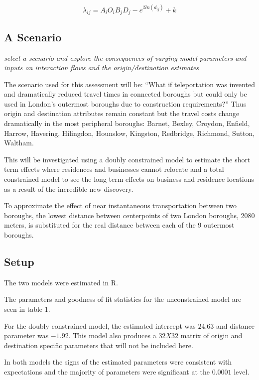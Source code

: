 \documentclass[11pt]{article} %
\begin{document}
\begin{equation}
\lambda_{ij} = A_i O_i  B_j D_j - e ^{ \beta ln( d_{ij})} + k
\end{equation}



\subsection{A Scenario}

\textit{select a scenario and explore the consequences of varying model parameters and inputs on interaction flows and the origin/destination estimates}

The scenario used for this assessment will be: ``What if teleportation  was invented and dramatically reduced travel times in connected boroughs but could only be used in London's outermost boroughs due to construction requirements?'' Thus origin and destination attributes remain constant but the travel costs change dramatically in the most peripheral boroughs: Barnet, Bexley, Croydon, Enfield, Harrow, Havering, Hilingdon, Hounslow, Kingston, Redbridge, Richmond, Sutton, Waltham. 


This will be investigated using a doubly constrained model to estimate the short term effects where residences and businesses cannot relocate and a total constrained model to see the long term effects on business and residence locations as a result of the incredible new discovery. 

To approximate the effect of near instantaneous transportation between two boroughs, the lowest distance between centerpoints of two London boroughs, 2080 meters, is substituted for the real distance between each of the 9 outermost boroughs. 

\subsection{Setup}

The two models were estimated in R. 

The parameters and goodness of fit statistics for the unconstrained model are seen in table 1. 

For the doubly constrained model, the estimated intercept was $24.63$ and distance parameter was $-1.92$. This model also produces a $32 X 32 $ matrix of origin and destination specific parameters that will not be included here. 

In both models the signs of the estimated parameters were consistent with expectations and the majority of parameters were significant at the $0.0001$ level.
\end{document}
